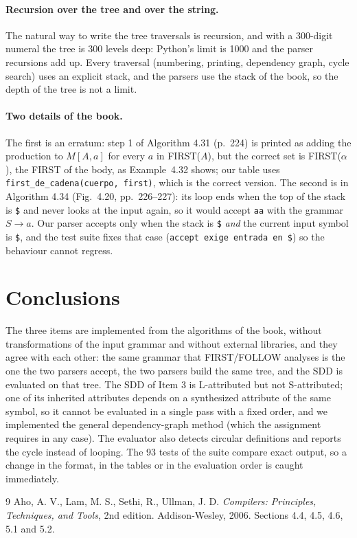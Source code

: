 \documentclass[11pt,letterpaper]{article}
\newcommand{\nt}[1]{\texttt{#1}}
\begin{document}
\paragraph{Recursion over the tree and over the string.} The natural way to write the tree traversals
is recursion, and with a 300-digit numeral the tree is 300 levels deep: Python's limit is 1000 and
the parser recursions add up. Every traversal (numbering, printing, dependency graph, cycle search)
uses an explicit stack, and the parsers use the stack of the book, so the depth of the tree is not
a limit.

\paragraph{Two details of the book.} The first is an erratum: step 1 of Algorithm 4.31 (p.~224) is
printed as adding the production to $M[A,a]$ for every $a$ in FIRST($A$), but the correct set is
FIRST($\alpha$), the FIRST of the body, as Example~4.32 shows; our table uses
\nt{first\_de\_cadena(cuerpo, first)}, which is the correct version. The second is in Algorithm 4.34
(Fig.~4.20, pp.~226--227): its loop ends when the top of the stack is \nt{\$} and never looks at the
input again, so it would accept \nt{aa} with the grammar $S \to a$. Our parser accepts only when the
stack is \nt{\$} \emph{and} the current input symbol is \nt{\$}, and the test suite fixes that case
(\nt{accept exige entrada en \$}) so the behaviour cannot regress.

\section{Conclusions}

The three items are implemented from the algorithms of the book, without transformations of the
input grammar and without external libraries, and they agree with each other: the same grammar that
FIRST/FOLLOW analyses is the one the two parsers accept, the two parsers build the same tree, and the
SDD is evaluated on that tree. The SDD of Item 3 is L-attributed but not S-attributed; one of its
inherited attributes depends on a synthesized attribute of the same symbol, so it cannot be evaluated
in a single pass with a fixed order, and we implemented the general dependency-graph method (which the
assignment requires in any case). The evaluator also detects circular definitions and reports the
cycle instead of looping. The 93 tests of
the suite compare exact output, so a change in the format, in the tables or in the evaluation order
is caught immediately.

\begin{thebibliography}{9}
 Aho, A. V., Lam, M. S., Sethi, R., Ullman, J. D. \emph{Compilers: Principles,
Techniques, and Tools}, 2nd edition. Addison-Wesley, 2006. Sections 4.4, 4.5, 4.6, 5.1 and 5.2.
\end{thebibliography}
\end{document}
